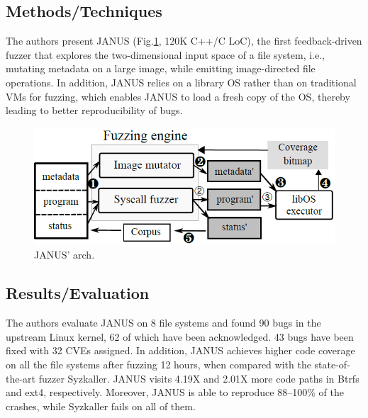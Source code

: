 \subsection{Methods/Techniques}
The authors present JANUS (Fig.\ref{fig:janus}, 120K C++/C LoC), the first feedback-driven fuzzer that explores the two-dimensional input space of a file system, i.e., mutating metadata on a large image, while emitting image-directed file operations. In addition, JANUS relies on a library OS rather than on traditional VMs for fuzzing, which enables JANUS to load a fresh copy of the OS, thereby leading to better reproducibility of bugs.
\begin{figure}[h]
    \centering
    \includegraphics[scale=0.5]{janus.png} %
    \caption{JANUS' arch.}	
    \label{fig:janus}
\end{figure}
\subsection{Results/Evaluation}
The authors evaluate JANUS on 8 file systems and found 90 bugs in the upstream Linux kernel, 62 of which have been acknowledged. 43 bugs have been fixed with 32 CVEs assigned. In addition, JANUS achieves higher code coverage on all the file systems after fuzzing 12 hours, when compared with the state-of-the-art fuzzer Syzkaller.  JANUS visits 4.19X and 2.01X more code paths in Btrfs and ext4, respectively. Moreover, JANUS is able to reproduce 88–100\% of the crashes, while Syzkaller fails on all of them.
